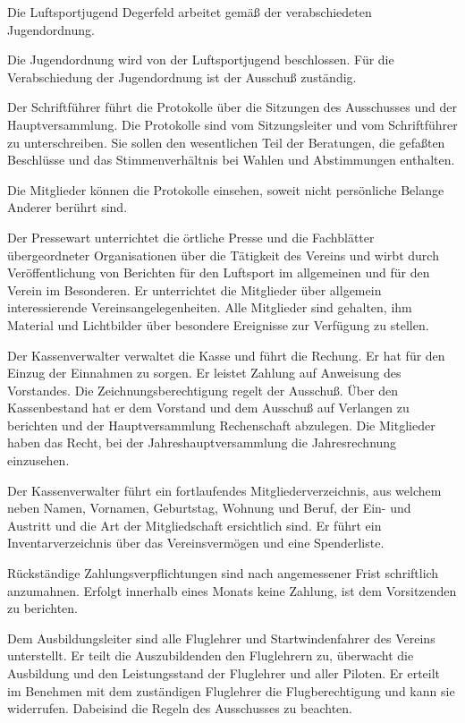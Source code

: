 \documentclass[10pt,a4paper,parskip=half]{scrartcl}
\begin{document}
\begin{contract}
\begin{multicols}{2}
\begin{enumerate}[label=\alph*),noitemsep]
\begin{enumerate}[label=\alph*),noitemsep]
    Die Luftsportjugend Degerfeld arbeitet gemäß der verabschiedeten Jugendordnung.
    
    Die Jugendordnung wird von der Luftsportjugend beschlossen. Für die Verabschiedung der Jugendordnung ist der Ausschuß zuständig.
    
    Der Schriftführer führt die Protokolle über die Sitzungen des Ausschusses und der Hauptversammlung.
    Die Protokolle sind vom Sitzungsleiter und vom Schriftführer zu unterschreiben.
    Sie sollen den wesentlichen Teil der Beratungen,
    die gefaßten Beschlüsse und das Stimmenverhältnis bei Wahlen und Abstimmungen enthalten.
    
    Die Mitglieder können die Protokolle einsehen,
    soweit nicht persönliche Belange Anderer berührt sind.
    
    Der Pressewart unterrichtet die örtliche Presse und die Fachblätter übergeordneter Organisationen über die Tätigkeit des Vereins und wirbt durch Veröffentlichung von Berichten für den Luftsport im allgemeinen und für den Verein im Besonderen.
    Er unterrichtet die Mitglieder über allgemein interessierende Vereinsangelegenheiten.
    Alle Mitglieder sind gehalten, ihm Material und Lichtbilder über besondere Ereignisse zur Verfügung zu stellen.
    
    Der Kassenverwalter verwaltet die Kasse und führt die Rechung.
    Er hat für den Einzug der Einnahmen zu sorgen.
    Er leistet Zahlung auf Anweisung des Vorstandes.
    Die Zeichnungsberechtigung regelt der Ausschuß.
    Über den Kassenbestand hat er dem Vorstand und dem Ausschuß auf Verlangen zu berichten und der Hauptversammlung Rechenschaft abzulegen.
    Die Mitglieder haben das Recht,
    bei der Jahreshauptversammlung die Jahresrechnung einzusehen.
    
    Der Kassenverwalter führt ein fortlaufendes Mitgliederverzeichnis,
    aus welchem neben Namen,
    Vornamen,
    Geburtstag,
    Wohnung und Beruf,
    der Ein- und Austritt und die Art der Mitgliedschaft ersichtlich sind.
    Er führt ein Inventarverzeichnis über das Vereinsvermögen und eine Spenderliste.
    
    Rückständige Zahlungsverpflichtungen sind nach angemessener Frist schriftlich anzumahnen.
    Erfolgt innerhalb eines Monats keine Zahlung,
    ist dem Vorsitzenden zu berichten.
    
    Dem Ausbildungsleiter sind alle Fluglehrer und Startwindenfahrer des Vereins unterstellt.
    Er teilt die Auszubildenden den Fluglehrern zu,
    überwacht die Ausbildung und den Leistungsstand der Fluglehrer und aller Piloten.
    Er erteilt im Benehmen mit dem zuständigen Fluglehrer die Flugberechtigung und kann sie widerrufen.
    Dabeisind die Regeln des Ausschusses zu beachten.
    

\end{enumerate}
\end{enumerate}
\end{multicols}
\end{contract}
\end{document}
